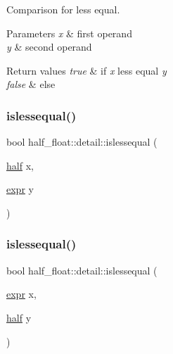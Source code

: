 Comparison for less equal. 
\begin{DoxyParams}{Parameters}
{\em x} & first operand \\
\hline
{\em y} & second operand \\
\hline
\end{DoxyParams}

\begin{DoxyRetVals}{Return values}
{\em true} & if {\itshape x} less equal {\itshape y} \\
\hline
{\em false} & else \\
\hline
\end{DoxyRetVals}
\mbox{\label{namespacehalf__float_1_1detail_ab84536d5ba40f3d79a8a90942625279b}} 
\subsubsection{\texorpdfstring{islessequal()}{islessequal()}\hspace{0.1cm}{\footnotesize\ttfamily [2/4]}}
{\footnotesize\ttfamily bool half\+\_\+float\+::detail\+::islessequal (\begin{DoxyParamCaption}\item[{\hyperlink{classhalf__float_1_1half}{half}}]{x,  }\item[{\hyperlink{structhalf__float_1_1detail_1_1expr}{expr}}]{y }\end{DoxyParamCaption})\hspace{0.3cm}{\ttfamily [inline]}}

\mbox{\label{namespacehalf__float_1_1detail_adfa3321c4be8e22cbd300eaa157d9961}} 
\subsubsection{\texorpdfstring{islessequal()}{islessequal()}\hspace{0.1cm}{\footnotesize\ttfamily [3/4]}}
{\footnotesize\ttfamily bool half\+\_\+float\+::detail\+::islessequal (\begin{DoxyParamCaption}\item[{\hyperlink{structhalf__float_1_1detail_1_1expr}{expr}}]{x,  }\item[{\hyperlink{classhalf__float_1_1half}{half}}]{y }\end{DoxyParamCaption})\hspace{0.3cm}{\ttfamily [inline]}}

